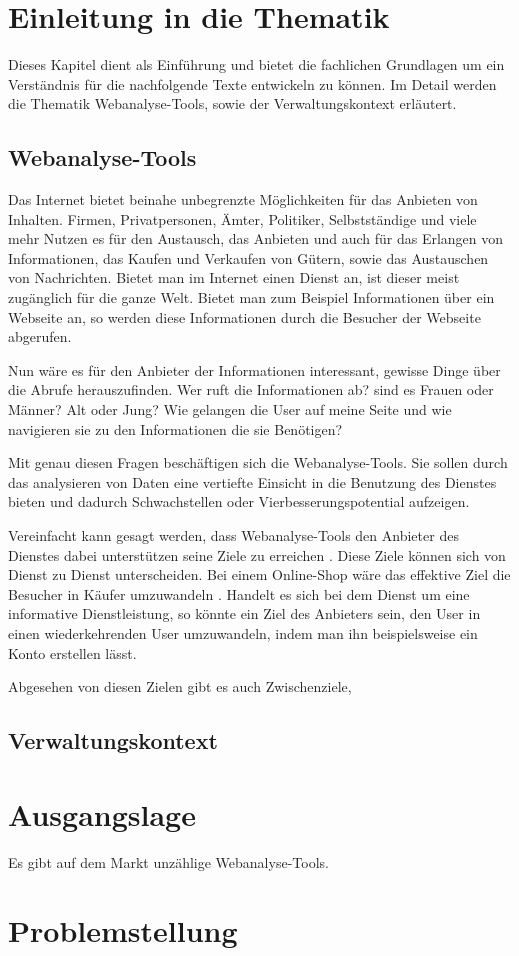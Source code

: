 \section{Einleitung in die Thematik}
Dieses Kapitel dient als Einführung und bietet die fachlichen Grundlagen um ein Verständnis für die nachfolgende Texte entwickeln zu können. Im Detail werden die Thematik Webanalyse-Tools, sowie der Verwaltungskontext erläutert.

\subsection{Webanalyse-Tools}
Das Internet bietet beinahe unbegrenzte Möglichkeiten für das Anbieten von Inhalten. Firmen, Privatpersonen, Ämter, Politiker, Selbstständige und viele mehr Nutzen es für den Austausch, das Anbieten und auch für das Erlangen von Informationen, das Kaufen und Verkaufen von Gütern, sowie das Austauschen von Nachrichten. Bietet man im Internet einen Dienst an, ist dieser meist zugänglich für die ganze Welt. Bietet man zum Beispiel Informationen über ein Webseite an, so werden diese Informationen durch die Besucher der Webseite abgerufen. 

Nun wäre es für den Anbieter der Informationen interessant, gewisse Dinge über die Abrufe herauszufinden. Wer ruft die Informationen ab? sind es Frauen oder Männer? Alt oder Jung? Wie gelangen die User auf meine Seite und wie navigieren sie zu den Informationen die sie Benötigen?

Mit genau diesen Fragen beschäftigen sich die Webanalyse-Tools. Sie sollen durch das analysieren von Daten eine vertiefte Einsicht in die Benutzung des Dienstes bieten und dadurch Schwachstellen oder Vierbesserungspotential aufzeigen. 

Vereinfacht kann gesagt werden, dass Webanalyse-Tools den Anbieter des Dienstes dabei unterstützen seine Ziele zu erreichen \parencite[S. 56]{AnalyticsForDummies}. Diese Ziele können sich von Dienst zu Dienst unterscheiden. Bei einem Online-Shop wäre das effektive Ziel die Besucher in Käufer umzuwandeln \parencite[S. 28]{AnalyticsForDummies}. Handelt es sich bei dem Dienst um eine informative Dienstleistung, so könnte ein Ziel des Anbieters sein, den User in einen wiederkehrenden User umzuwandeln, indem man ihn beispielsweise ein Konto erstellen lässt.

Abgesehen von diesen Zielen gibt es auch Zwischenziele, 

\subsection{Verwaltungskontext}


\section{Ausgangslage}
Es gibt auf dem Markt unzählige Webanalyse-Tools. 

\section{Problemstellung}

